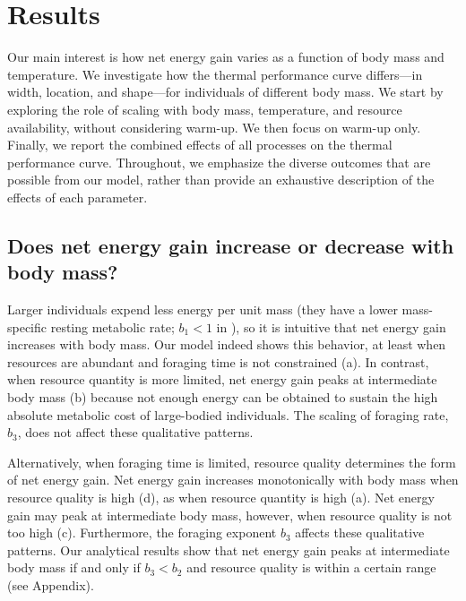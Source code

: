 \section*{Results}

Our main interest is how net energy gain varies as a function of body mass and temperature.
We investigate how the thermal performance curve differs---in width, location, and shape---for individuals of different body mass.
We start by exploring the role of scaling with body mass, temperature, and resource availability, without considering warm-up.
We then focus on warm-up only.
Finally, we report the combined effects of all processes on the thermal performance curve.
Throughout, we emphasize the diverse outcomes that are possible from our model, rather than provide an exhaustive description of the effects of each parameter.


\subsection*{Does net energy gain increase or decrease with body mass?}

Larger individuals expend less energy per unit mass (they have a lower mass-specific resting metabolic rate; $b_1 < 1$ in ), so it is intuitive that net energy gain increases with body mass.
Our model indeed shows this behavior, at least when resources are abundant and foraging time is not constrained (a).
In contrast, when resource quantity is more limited, net energy gain peaks at intermediate body mass (b) because not enough energy can be obtained to sustain the high absolute metabolic cost of large-bodied individuals.
The scaling of foraging rate, $b_3$, does not affect these qualitative patterns.

Alternatively, when foraging time is limited, resource quality determines the form of net energy gain.
Net energy gain increases monotonically with body mass when resource quality is high (d), as when resource quantity is high (a).
Net energy gain may peak at intermediate body mass, however, when resource quality is not too high (c).
Furthermore, the foraging exponent $b_3$ affects these qualitative patterns.
Our analytical results show that net energy gain peaks at intermediate body mass if and only if $b_3 < b_2$ and resource quality is within a certain range (see Appendix).

